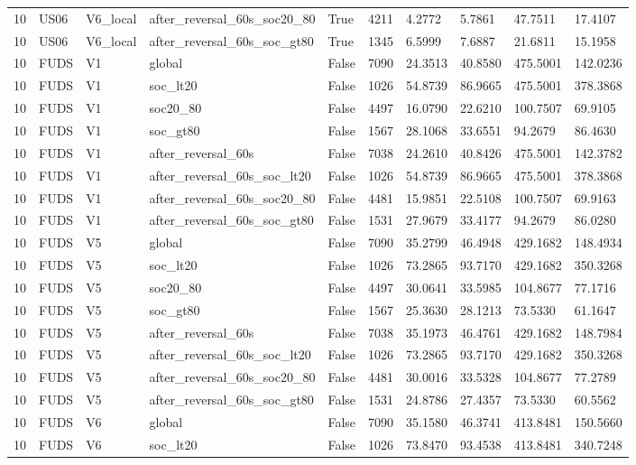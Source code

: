 \begin{tabular}{llllllllll}
10 & US06 & V6\_local & after\_reversal\_60s\_soc20\_80 & True & 4211 & 4.2772 & 5.7861 & 47.7511 & 17.4107 \\
10 & US06 & V6\_local & after\_reversal\_60s\_soc\_gt80 & True & 1345 & 6.5999 & 7.6887 & 21.6811 & 15.1958 \\
10 & FUDS & V1 & global & False & 7090 & 24.3513 & 40.8580 & 475.5001 & 142.0236 \\
10 & FUDS & V1 & soc\_lt20 & False & 1026 & 54.8739 & 86.9665 & 475.5001 & 378.3868 \\
10 & FUDS & V1 & soc20\_80 & False & 4497 & 16.0790 & 22.6210 & 100.7507 & 69.9105 \\
10 & FUDS & V1 & soc\_gt80 & False & 1567 & 28.1068 & 33.6551 & 94.2679 & 86.4630 \\
10 & FUDS & V1 & after\_reversal\_60s & False & 7038 & 24.2610 & 40.8426 & 475.5001 & 142.3782 \\
10 & FUDS & V1 & after\_reversal\_60s\_soc\_lt20 & False & 1026 & 54.8739 & 86.9665 & 475.5001 & 378.3868 \\
10 & FUDS & V1 & after\_reversal\_60s\_soc20\_80 & False & 4481 & 15.9851 & 22.5108 & 100.7507 & 69.9163 \\
10 & FUDS & V1 & after\_reversal\_60s\_soc\_gt80 & False & 1531 & 27.9679 & 33.4177 & 94.2679 & 86.0280 \\
10 & FUDS & V5 & global & False & 7090 & 35.2799 & 46.4948 & 429.1682 & 148.4934 \\
10 & FUDS & V5 & soc\_lt20 & False & 1026 & 73.2865 & 93.7170 & 429.1682 & 350.3268 \\
10 & FUDS & V5 & soc20\_80 & False & 4497 & 30.0641 & 33.5985 & 104.8677 & 77.1716 \\
10 & FUDS & V5 & soc\_gt80 & False & 1567 & 25.3630 & 28.1213 & 73.5330 & 61.1647 \\
10 & FUDS & V5 & after\_reversal\_60s & False & 7038 & 35.1973 & 46.4761 & 429.1682 & 148.7984 \\
10 & FUDS & V5 & after\_reversal\_60s\_soc\_lt20 & False & 1026 & 73.2865 & 93.7170 & 429.1682 & 350.3268 \\
10 & FUDS & V5 & after\_reversal\_60s\_soc20\_80 & False & 4481 & 30.0016 & 33.5328 & 104.8677 & 77.2789 \\
10 & FUDS & V5 & after\_reversal\_60s\_soc\_gt80 & False & 1531 & 24.8786 & 27.4357 & 73.5330 & 60.5562 \\
10 & FUDS & V6 & global & False & 7090 & 35.1580 & 46.3741 & 413.8481 & 150.5660 \\
10 & FUDS & V6 & soc\_lt20 & False & 1026 & 73.8470 & 93.4538 & 413.8481 & 340.7248 \\

\end{tabular}
